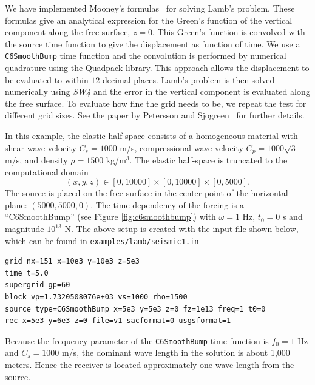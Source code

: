 \documentclass[11pt]{report}
\begin{document}
We have implemented Mooney's formulas~\cite{Mooney_1974} for solving Lamb's problem. These formulas
give an analytical expression for the Green's function of the vertical component along the free
surface, $z=0$. This Green's function is convolved with the source time function to give the
displacement as function of time. We use a {\tt C6SmoothBump} time function and the convolution is
performed by numerical quadrature using the Quadpack library. This approach allows the displacement
to be evaluated to within $12$ decimal places. Lamb's problem is then solved numerically using
\emph{SW4} and the error in the vertical component is evaluated along the free surface. To evaluate
how fine the grid needs to be, we repeat the test for different grid sizes. See the paper by
Petersson and Sjogreen~\cite{PetSjo-14} for further details.

In this example, the elastic half-space consists of a homogeneous material with shear wave
velocity $C_s=1000$ m/s, compressional wave velocity $C_p=1000\sqrt{3}$ m/s, and density $\rho=1500$
kg/m$^3$. The elastic half-space is truncated to the computational domain
\[
(x,y,z) \in [0,10000] \times [0,10000]\times[0,5000].
\]
The source is placed on the free surface in the center point of the horizontal plane:
$(5000,5000,0)$. The time dependency of the forcing is a ``C6SmoothBump'' (see Figure
\ref{fig:c6smoothbump}) with $\omega=1$ Hz, $t_0=0$ s and magnitude $10^{13}$ N. The above setup is
created with the input file shown below, which can be found in {\tt examples/lamb/seismic1.in}
\begin{verbatim}
grid nx=151 x=10e3 y=10e3 z=5e3
time t=5.0
supergrid gp=60
block vp=1.7320508076e+03 vs=1000 rho=1500
source type=C6SmoothBump x=5e3 y=5e3 z=0 fz=1e13 freq=1 t0=0
rec x=5e3 y=6e3 z=0 file=v1 sacformat=0 usgsformat=1
\end{verbatim}
Because the frequency parameter of the {\tt C6SmoothBump} time function is $f_0=1$ Hz and $C_s=1000$
m/s, the dominant wave length in the solution is about 1,000 meters. Hence the receiver is located
approximately one wave length from the source.
\end{document}
